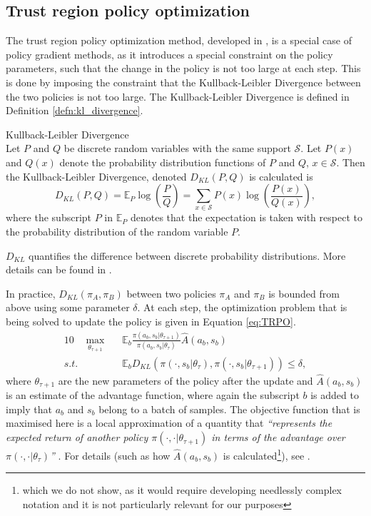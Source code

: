 \subsection{Trust region policy optimization}
The trust region policy optimization method, developed in \cite{TRPO}, is a special case of policy gradient methods, as it introduces a special constraint on the policy parameters, such that the change in the policy is not too large at each step. This is done by imposing the constraint that the Kullback-Leibler Divergence between the two policies is not too large. The Kullback-Leibler Divergence is defined in Definition \ref{defn:kl_divergence}.
\begin{defn} \label{defn:kl_divergence}
{Kullback-Leibler Divergence}
\\
Let $P$ and $Q$ be discrete random variables with the same support $\mathcal{S}$. Let $P(x)$ and $Q(x)$ denote the probability distribution functions of $P$ and $Q$, $x \in \mathcal{S}$. Then the Kullback-Leibler Divergence, denoted $D_{KL}(P,Q)$ is calculated is
\begin{equation*}
D_{KL}(P,Q) = \mathbb{E}_{P} \log(\frac{P}{Q}) = \sum_{x \in \mathcal{S}} P(x) \log(\frac{P(x)}{Q(x)}),	
\end{equation*}
where the subscript $P$ in $\mathbb{E}_{P}$ denotes that the expectation is taken with respect to the probability distribution of the random variable $P$.
\end{defn}
$D_{KL}$ quantifies the difference between discrete probability distributions. More details can be found in \cite{KL_divergence}.

In practice, $D_{KL}(\pi_{A},\pi_{B})$ between two policies $\pi_{A}$ and $\pi_{B}$ is bounded from above using some parameter $\delta$. At each step, the optimization problem that is being solved to update the policy is given in Equation \ref{eq:TRPO}.
\begin{alignat}{10}
&  \underset{\theta_{\tau+1}}{\max} \, && \mathbb{E}_b \frac{\pi(a_b, s_b|\theta_{\tau+1})}{\pi(a_b, s_b|\theta_{\tau})} \widehat{A}(a_b, s_b) \label{eq:TRPO} \\
s.t. & && \mathbb{E}_b D_{KL}(\pi(\cdot, s_b|\theta_{\tau}), \pi(\cdot, s_b|\theta_{\tau+1})) \leq \delta \nonumber,
\end{alignat}
where $\theta_{\tau+1}$ are the new parameters of the policy after the update and $\widehat{A}(a_b, s_b)$ is an estimate of the advantage function, where again the subscript $b$ is added to imply that $a_b$ and $s_b$ belong to a batch of samples.
The objective function that is maximised here is a local approximation of a quantity that \textit{“represents the expected return
of another policy $\pi(\cdot,\cdot|\theta_{\tau+1})$ in terms of the advantage over $\pi(\cdot,\cdot|\theta_{\tau})$”} \cite[Equation 1]{TRPO}. For details (such as how $\widehat{A}(a_b, s_b)$ is calculated\footnote{which we do not show, as it would require developing needlessly complex notation and it is not particularly relevant for our purposes}), see \cite[Section 2-4]{TRPO}.

